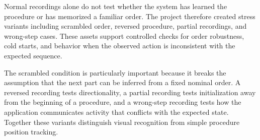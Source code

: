 Normal recordings alone do not test whether the system has learned the
procedure or has memorized a familiar order. The project therefore created
stress variants including scrambled order, reversed procedure, partial
recordings, and wrong-step cases. These assets support controlled checks for
order robustness, cold starts, and behavior when the observed action is
inconsistent with the expected sequence.

The scrambled condition is particularly important because it breaks the
assumption that the next part can be inferred from a fixed nominal order. A
reversed recording tests directionality, a partial recording tests initialization
away from the beginning of a procedure, and a wrong-step recording tests how
the application communicates activity that conflicts with the expected state.
Together these variants distinguish visual recognition from simple procedure
position tracking.
